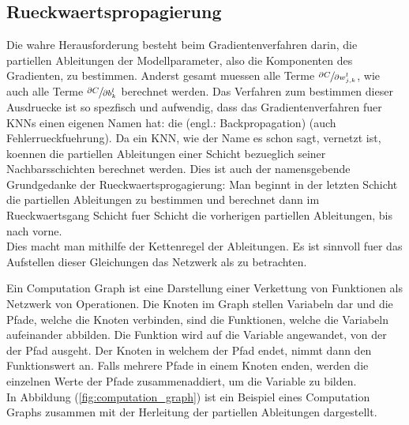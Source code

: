 \subsection{Rueckwaertspropagierung}\label{sec:backpropagation}
Die wahre Herausforderung besteht beim Gradientenverfahren darin,
die partiellen Ableitungen der Modellparameter,
also die Komponenten des Gradienten, zu bestimmen.
Anderst gesamt muessen alle Terme
$\sfrac{\partial C}{\partial w_{j,k}^l}$, wie auch alle Terme $\sfrac{\partial C}{\partial b_k^l}$
berechnet werden.
Das Verfahren zum bestimmen dieser Ausdruecke ist so spezfisch und aufwendig,
dass das Gradientenverfahren fuer KNNs einen eigenen Namen hat: die
 (engl.: Backpropagation) (auch Fehlerrueckfuehrung).
\para{}
Da ein KNN, wie der Name es schon sagt, vernetzt ist, koennen die partiellen
Ableitungen einer Schicht bezueglich seiner Nachbarsschichten berechnet werden.
Dies ist auch der namensgebende Grundgedanke der Rueckwaertsprogagierung: Man
beginnt in der letzten Schicht die partiellen Ableitungen zu bestimmen und
berechnet dann im Rueckwaertsgang Schicht fuer Schicht die vorherigen
partiellen Ableitungen, bis nach vorne. \\
Dies macht man mithilfe der Kettenregel der Ableitungen.
Es ist sinnvoll fuer das Aufstellen dieser Gleichungen das Netzwerk als
 zu betrachten.
\para{}

Ein Computation Graph ist eine Darstellung einer Verkettung von Funktionen als Netzwerk von Operationen.
Die Knoten im Graph stellen Variabeln dar und die Pfade, welche die Knoten
verbinden, sind die Funktionen, welche die Variabeln aufeinander abbilden. Die
Funktion wird auf die Variable angewandet, von der der Pfad ausgeht. Der Knoten
in welchem der Pfad endet, nimmt dann den Funktionswert an. Falls
mehrere Pfade in einem Knoten enden, werden die einzelnen Werte der Pfade
zusammenaddiert, um die Variable zu bilden. \\
In Abbildung (\ref{fig:computation_graph}) ist ein Beispiel eines Computation
Graphs zusammen mit der Herleitung der partiellen Ableitungen dargestellt.


